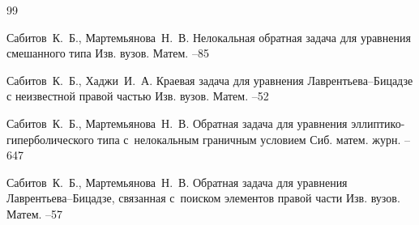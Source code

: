 \begin{thebibliography}{99}

\by Сабитов~К.~Б., Мартемьянова~Н.~В.
\paper Нелокальная обратная задача для уравнения смешанного типа
\jour Изв. вузов. Матем.
--85

\by  Сабитов~К.~Б., Хаджи~И.~А.
\paper Краевая задача для уравнения Лаврентьева--Бицадзе с неизвестной правой частью
\jour Изв. вузов. Матем.
--52

\by Сабитов~К.~Б., Мартемьянова~Н.~В. 
\paper Обратная задача для уравнения эллиптико-гиперболического типа с~нелокальным граничным условием
\jour Сиб. матем. журн.
--647

\by Сабитов~К.~Б., Мартемьянова~Н.~В. 
\paper Обратная задача для уравнения Лаврентьева--Бицадзе, связанная с~поиском элементов правой части
\jour Изв. вузов. Матем.
--57


\end{thebibliography}
